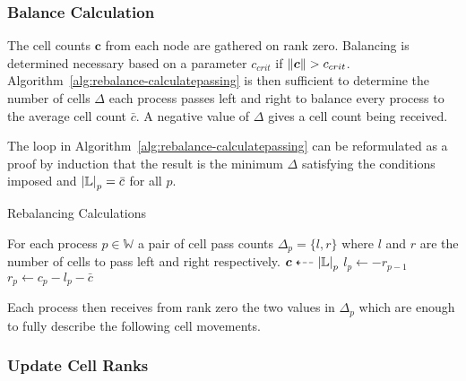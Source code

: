 \documentclass[twoside]{IIBproject}
\newcommand{\vect} [1] {\bm{#1}}
\newcommand{\dla}{\dashleftarrow}
\numberwithin{figure}{section}
\begin{document}
        \subsubsection{Balance Calculation} %
            \label{sec:rebalancing-calc}

            The cell counts $\vect{c}$ from each node are gathered on rank zero. Balancing is determined necessary based on a parameter $c_{crit}$ if $\norm{\vect{c}}>c_{crit}$. Algorithm~\ref{alg:rebalance-calculatepassing} is then sufficient to determine the number of cells $\Delta$ each process passes left and right to balance every process to the average cell count $\bar c$. A negative value of $\Delta$ gives a cell count being received.

            The loop in Algorithm~\ref{alg:rebalance-calculatepassing} can be reformulated as a proof by induction that the result is the minimum $\Delta$ satisfying the conditions imposed and $\abs{\mathbb{L}}_p=\bar c$ for all $p$.

            \begin{algorithm}[!htbp]
                \caption{Rebalancing Calculations}
                \label{alg:rebalance-calculatepassing}

                \begin{algorithmic}
                    \Ensure For each process $p \in \mathbb{W}$ a pair of cell pass counts $\Delta_p = \{l,r\}$ where $l$ and $r$ are the number of cells to pass left and right respectively.
                    \Statex
                    \Gather $\vect{c} \dla \abs{\mathbb{L}}_p $
                        \State $l_p \gets -r_{p-1}$
                        \State $r_p \gets c_p - l_p - \bar{c}$
                    \EndFor
                \end{algorithmic}
            \end{algorithm}

            Each process then receives from rank zero the two values in $\Delta_p$ which are enough to fully describe the following cell movements.



        \subsubsection{Update Cell Ranks} %
            \label{sec:rebalancing-updatecellranks}
\end{document}
